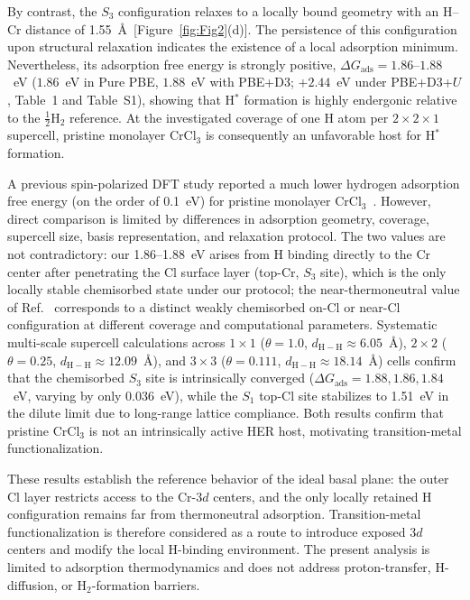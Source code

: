 \documentclass[journal=jacsat,manuscript=article]{achemso}
\begin{document}
By contrast, the $S_3$ configuration relaxes to a locally bound geometry with an H--Cr distance of 1.55~\AA\ [Figure~\ref{fig:Fig2}(d)]. The persistence of this configuration upon structural relaxation indicates the existence of a local adsorption minimum. Nevertheless, its adsorption free energy is strongly positive, $\Delta G_{\mathrm{ads}} = 1.86$--$1.88$~eV ($1.86$~eV in Pure PBE, $1.88$~eV with PBE+D3; $+2.44$~eV under PBE+D3+$U$, Table~1 and Table~S1), showing that H$^*$ formation is highly endergonic relative to the $\frac{1}{2}$H$_2$ reference. At the investigated coverage of one H atom per $2\times2\times1$ supercell, pristine monolayer CrCl$_3$ is consequently an unfavorable host for H$^*$ formation. {\color{revcolor}%
  A previous spin-polarized DFT study reported a much lower hydrogen adsorption free energy (on the order of 0.1~eV) for pristine monolayer CrCl$_3$~\cite{Zala2024}. However, direct comparison is limited by differences in adsorption geometry, coverage, supercell size, basis representation, and relaxation protocol. The two values are not contradictory: our 1.86--1.88~eV arises from H binding directly to the Cr center after penetrating the Cl surface layer (top-Cr, $S_3$ site), which is the only locally stable chemisorbed state under our protocol; the near-thermoneutral value of Ref.~\cite{Zala2024} corresponds to a distinct weakly chemisorbed on-Cl or near-Cl configuration at different coverage and computational parameters. Systematic multi-scale supercell calculations across $1\times 1$ ($\theta = 1.0$, $d_{\mathrm{H-H}} \approx 6.05$~\AA), $2\times 2$ ($\theta = 0.25$, $d_{\mathrm{H-H}} \approx 12.09$~\AA), and $3\times 3$ ($\theta = 0.111$, $d_{\mathrm{H-H}} \approx 18.14$~\AA) cells confirm that the chemisorbed $S_3$ site is intrinsically converged ($\Delta G_{\mathrm{ads}} = 1.88, 1.86, 1.84$~eV, varying by only 0.036~eV), while the $S_1$ top-Cl site stabilizes to 1.51~eV in the dilute limit due to long-range lattice compliance. Both results confirm that pristine CrCl$_3$ is not an intrinsically active HER host, motivating transition-metal functionalization.
\par}

These results establish the reference behavior of the ideal basal plane: the outer Cl layer restricts access to the Cr-$3d$ centers, and the only locally retained H configuration remains far from thermoneutral adsorption. Transition-metal functionalization is therefore considered as a route to introduce exposed $3d$ centers and modify the local H-binding environment. The present analysis is limited to adsorption thermodynamics and does not address proton-transfer, H-diffusion, or H$_2$-formation barriers.
\end{document}
